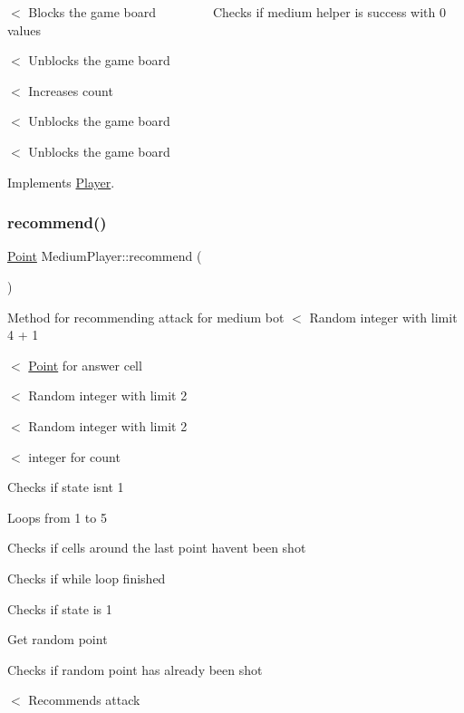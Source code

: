 $<$ Blocks the game board ~\newline
~\newline
~\newline
~\newline
~\newline
 Checks if medium helper is success with 0 values

$<$ Unblocks the game board

$<$ Increases count

$<$ Unblocks the game board

$<$ Unblocks the game board 

Implements \mbox{\hyperlink{class_player_ab89c1180c7314d3e19bcf4b2bed2e02a}{Player}}.

\mbox{\label{class_medium_player_a2e99d57f30f3f7f929840b8cda16527d}} 
\subsubsection{\texorpdfstring{recommend()}{recommend()}}
{\footnotesize\ttfamily \mbox{\hyperlink{class_point}{Point}} Medium\+Player\+::recommend (\begin{DoxyParamCaption}{ }\end{DoxyParamCaption})\hspace{0.3cm}{\ttfamily [virtual]}}

Method for recommending attack for medium bot $<$ Random integer with limit 4 + 1

$<$ \mbox{\hyperlink{class_point}{Point}} for answer cell

$<$ Random integer with limit 2

$<$ Random integer with limit 2

$<$ integer for count

Checks if state isn\textquotesingle{}t 1

Loops from 1 to 5

Checks if cells around the last point haven\textquotesingle{}t been shot

Checks if while loop finished

Checks if state is 1

Get random point

Checks if random point has already been shot

$<$ Recommends attack

